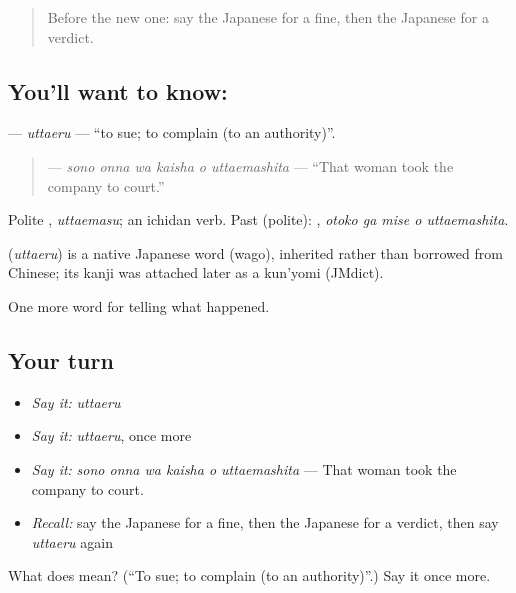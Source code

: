 \begin{quote}
Before the new one: say the Japanese for a fine, then the Japanese for a verdict.
\end{quote}

\subsection*{You'll want to know: }
\textbf{} — \emph{uttaeru} — \textquotedblleft{}to sue; to complain (to an authority)\textquotedblright{}.

\begin{quote}
\textbf{   } — \emph{sono onna wa kaisha o uttaemashita} — \textquotedblleft{}That woman took the company to court.\textquotedblright{}
\end{quote}

Polite \textbf{}, \emph{uttaemasu}; an ichidan verb. Past (polite): \textbf{  }, \emph{otoko ga mise o uttaemashita}.

\begin{cousinweb}
\textbf{} (\emph{uttaeru}) is a native Japanese word (wago), inherited rather than borrowed from Chinese; its kanji was attached later as a kun'yomi (JMdict).
\end{cousinweb}

\begin{grammarlens}[title={What you've built}]
One more word for telling what happened.
\end{grammarlens}

\subsection*{Your turn}
\begin{itemize}
\raggedright
  \item \emph{Say it:} \emph{uttaeru}
  \item \emph{Say it:} \emph{uttaeru}, once more
  \item \emph{Say it:} \emph{sono onna wa kaisha o uttaemashita} — That woman took the company to court.
  \item \emph{Recall:} say the Japanese for a fine, then the Japanese for a verdict, then say \emph{uttaeru} again
\end{itemize}

\begin{tcolorbox}[breakable,colback=teal!4,colframe=teal!35!black,title={Before you move on}]
What does  mean? (\textquotedblleft{}To sue; to complain (to an authority)\textquotedblright{}.) Say it once more.
\end{tcolorbox}
